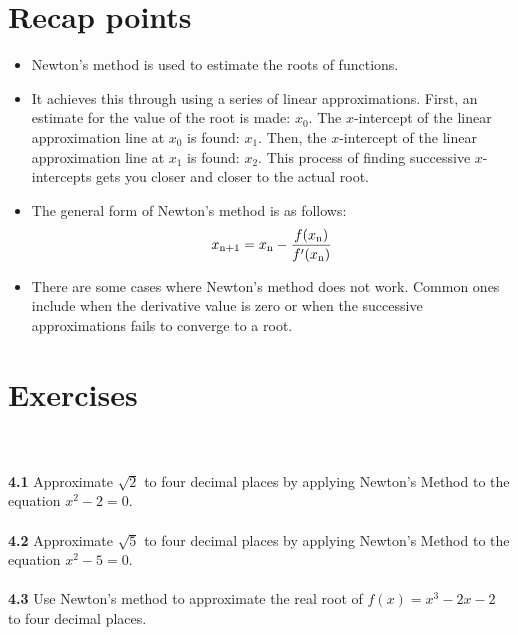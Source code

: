 \documentclass[11pt]{scrartcl}
\begin{document}
\section{Recap points}
\begin{itemize}
    \item Newton's method is used to estimate the roots of functions. 
    \item It achieves this through using a series of linear approximations. First, an estimate for the value of the root is made: $x_0$. The $x$-intercept of the linear approximation line at $x_0$ is found: $x_1$. Then, the $x$-intercept of the linear approximation line at $x_1$ is found: $x_2$. This process of finding successive $x$-intercepts gets you closer and closer to the actual root. 
    \item The general form of Newton's method is as follows: 
    $$x\textsubscript{n+1} = x\textsubscript{n} - \frac{f(x\textsubscript{n})}{f'(x\textsubscript{n})}$$
    \item There are some cases where Newton's method does not work. Common ones include when the derivative value is zero or when the successive approximations fails to converge to a root. 
\end{itemize}
\section{Exercises}\\
\\
\noindent 
\textbf{4.1} Approximate $\sqrt{2}$ to four decimal places by applying Newton's Method to the equation $x^2-2=0$.\\
\\
\noindent 
\textbf{4.2} Approximate $\sqrt{5}$ to four decimal places by applying Newton's Method to the equation $x^2-5=0$. \\
\\
\noindent 
\textbf{4.3} Use Newton's method to approximate the real root of $f(x)=x^3-2x-2$ to four decimal places. 
\end{document}
